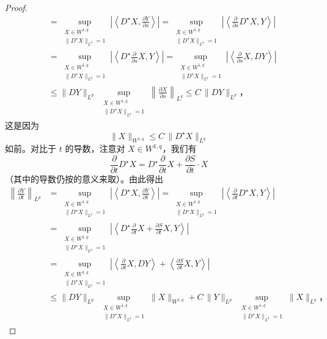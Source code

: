 \begin{proof}
\[\begin{aligned}
&=\sup_{\substack{X\in W^{1,q}\\ \|D^{\star}X\|_{L^{q}}=1}}\left|\left\langle D^{\star}X,\frac{\partial Y}{\partial s}\right\rangle\right|
=\sup_{\substack{X\in W^{1,q}\\ \|D^{\star}X\|_{L^{q}}=1}}\left|\left\langle\frac{\partial}{\partial s}D^{\star}X,Y\right\rangle\right|\\
&=\sup_{\substack{X\in W^{1,q}\\ \|D^{\star}X\|_{L^{q}}=1}}\left|\left\langle D^{\star}\frac{\partial}{\partial s}X,Y\right\rangle\right|
=\sup_{\substack{X\in W^{1,q}\\ \|D^{\star}X\|_{L^{q}}=1}}\left|\left\langle\frac{\partial}{\partial s}X,DY\right\rangle\right|\\
&\le\|DY\|_{L^{p}}\ \sup_{\substack{X\in W^{1,q}\\ \|D^{\star}X\|_{L^{q}}=1}}\left\|\frac{\partial X}{\partial s}\right\|_{L^{q}}\le C\,\|DY\|_{L^{p}}\text{，}
\end{aligned}
\]
这是因为
\[
\|X\|_{W^{1,q}}\le C\,\|D^{\star}X\|_{L^{q}}
\]
如前。对比于 $t$ 的导数，注意对 $X\in W^{1,q}$，我们有
\[
\frac{\partial}{\partial t}D^{\star}X=D^{\star}\frac{\partial}{\partial t}X+\frac{\partial S}{\partial t}\cdot X
\]
（其中的导数仍按\trDistribution{}的意义来取）。由此得出
\[
\begin{aligned}
\left\|\frac{\partial Y}{\partial t}\right\|_{L^{p}}
&=\sup_{\substack{X\in W^{1,q}\\ \|D^{\star}X\|_{L^{q}}=1}}\left|\left\langle D^{\star}X,\frac{\partial Y}{\partial t}\right\rangle\right|
=\sup_{\substack{X\in W^{1,q}\\ \|D^{\star}X\|_{L^{q}}=1}}\left|\left\langle\frac{\partial}{\partial t}D^{\star}X,Y\right\rangle\right|\\
&=\sup_{\substack{X\in W^{1,q}\\ \|D^{\star}X\|_{L^{q}}=1}}\left|\left\langle D^{\star}\frac{\partial}{\partial t}X+\frac{\partial S}{\partial t}X,Y\right\rangle\right|\\
&=\sup_{\substack{X\in W^{1,q}\\ \|D^{\star}X\|_{L^{q}}=1}}\left|\left\langle\frac{\partial}{\partial t}X,DY\right\rangle+\left\langle\frac{\partial S}{\partial t}X,Y\right\rangle\right|\\
&\le\|DY\|_{L^{p}}\ \sup_{\substack{X\in W^{1,q}\\ \|D^{\star}X\|_{L^{q}}=1}}\|X\|_{W^{1,q}}+C\,\|Y\|_{L^{p}}\ \sup_{\substack{X\in W^{1,q}\\ \|D^{\star}X\|_{L^{q}}=1}}\|X\|_{L^{q}}\text{，}

\end{aligned}\]
\end{proof}
